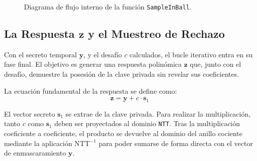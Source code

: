 \documentclass[11pt, a4paper]{report}
\theoremstyle{definition}
\begin{document}
\begin{figure}[H]
{
    }
    \caption{Diagrama de flujo interno de la función \texttt{SampleInBall}.}
    \label{fig:sign_sampleinball}
\end{figure}

\subsection{La Respuesta $\mathbf{z}$ y el Muestreo de Rechazo}
\label{subsec:respuesta_z_rechazo}

Con el secreto temporal $\mathbf{y}$, y el desafío $c$ calculados, el bucle iterativo entra en su fase final. El objetivo es generar una respuesta polinómica $\mathbf{z}$ que, junto con el desafío, demuestre la posesión de la clave privada sin revelar sus coeficientes.

La ecuación fundamental de la respuesta se define como:
\begin{equation}
    \mathbf{z} = \mathbf{y} + c \cdot \mathbf{s}_1
\end{equation}

El vector secreto $\mathbf{s}_1$ se extrae de la clave privada. Para realizar la multiplicación, tanto $c$ como $\mathbf{s}_1$ deben ser proyectados al dominio \texttt{NTT}. Tras la multiplicación coeficiente a coeficiente, el producto se devuelve al dominio del anillo cociente mediante la aplicación $\text{NTT}^{-1}$ para poder sumarse de forma directa con el vector de enmascaramiento $\mathbf{y}$.
\end{document}
